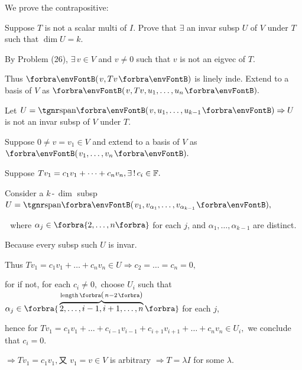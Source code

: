 \documentclass[a4paper, 11pt, UTF8]{article}
\begin{document}
\begin{large}
We prove the contrapositive:\par\quad
{\tgsl Suppose $T$ is not a scalar multi of $I$. Prove that $\exists$ an invar subsp $U$ of $V$ under $T$ such that $\dim U=k$.}\par\quad
By Problem (26), $\exists\,v\in V$ and $v\neq 0$ such that $v$ is not an eigvec of $T.$\par\quad
Thus $\Par{v,Tv}$ is linely inde. Extend to a basis of $V$ as $\Par{v,Tv,u_1,\dots,u_n}.$\par\quad
Let $U=\Span{v,u_1,\dots,u_{k-1}}\Rightarrow U$ is not an invar subsp of $V$ under $T.$\par\quad
\Or Suppose $0\neq v=v_1\in V$ and extend to a basis of $V$ as $\Par{v_1,\dots,v_n}.$\par\quad
Suppose $Tv_1=c_1 v_1+\dots+c_n v_n,\exists\,!\,c_i\in{\mathbb{F}}.$\par\quad
Consider a $k\,$-$\,\dim$ subsp $U=\Span{v_1,v_{\alpha_1},\dots,v_{\alpha_{k-1}}},$\par\qquad\qquad\,\,
where $\alpha_j\in\Bra{2,\dots,n}$ for each $j$, and $\alpha_1,\dots,\alpha_{k-1}$ are distinct.\par\quad
Because every subsp such $U$ is invar.\par\quad
Thus $Tv_1=c_1 v_1+\dots+c_n v_n\in U\Rightarrow c_2=\dots=c_n=0,$\par\quad
for if not, for each $c_i\neq 0,$ choose $U_i$ such that $\alpha_j\in\Bra{\overbrace{2,\dots,i-1,i+1,\dots,n}^{\text{length}\,\envFontSmall\Par{n-2}}}$ for each $j$,\par\quad
hence for $Tv_1=c_1 v_1+\dots+c_{i-1}v_{i-1}+c_{i+1}v_{i+1}+\dots+c_n v_n\in U_i,$ we conclude that $c_i=0.$\par\quad
$\Rightarrow Tv_1=c_1 v_1, $又 $v_1=v\in V$ is arbitrary $\Rightarrow T=\lambda I$ for some $\lambda.$\PfEnd
\SepLine

\par


\end{large}
\end{document}

